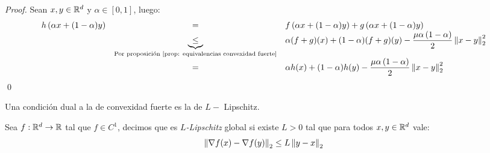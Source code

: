 \begin{proof}
	Sean $x,y \in {\mathbb{R}}^d$ y $\alpha \in [0,1]$, luego:
	\begin{equation*}
	\begin{array}{rcl}
	h\left(\alpha x + (1-\alpha)y\right) & = & f\left(\alpha x + (1-\alpha)y\right)  + g\left(\alpha x + (1-\alpha)y\right)  \\
	& \underbrace{\leq}_{\text{Por proposici\'on \ref{prop: equivalencias convexidad fuerte}}} & \alpha(f + g)(x) + (1-\alpha)(f+g)(y) - \dfrac{\mu \alpha \left(1-\alpha\right)}{2} \left\lVert x-y\right\rVert^2_2 \\
	& = & \alpha h(x) + (1-\alpha)h(y) - \dfrac{\mu \alpha \left(1-\alpha\right)}{2} \left\lVert x-y\right\rVert^2_2 
	\end{array}
	\end{equation*}\qed
\end{proof}

Una condici\'on dual a la de convexidad fuerte es la de $L-$ Lipschitz.

\begin{definition}
	\label{def: L Lipschitz}
	Sea $f:{\mathbb{R}}^d \rightarrow {\mathbb{R}}$ tal que $f \in C^1$, decimos que es $L$\textit{-Lipschitz} global si existe $L > 0$ tal que para todos $x,y \in {\mathbb{R}}^d$ vale:
	\begin{equation}
	\left\lVert\nabla f(x) - \nabla f (y)\right\rVert_2 \leq  L\left\lVert y-x\right\rVert_2
	\end{equation}
\end{definition}

